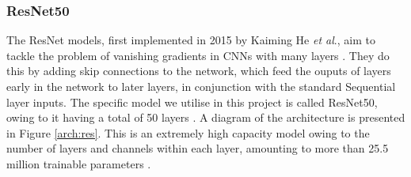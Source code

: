 \documentclass[12pt]{article}
\begin{document}
\subsubsection{ResNet50}
The ResNet models, first implemented in 2015 by Kaiming He \textit{et al}., aim to tackle the problem of vanishing gradients in CNNs with many layers \cite{He15}. They do this by adding skip connections to the network, which feed the ouputs of layers early in the network to later layers, in conjunction with the standard Sequential layer inputs. The specific model we utilise in this project is called ResNet50, owing to it having a total of 50 layers \cite{He15}. A diagram of the architecture is presented in Figure \ref{arch:res}. This is an extremely high capacity model owing to the number of layers and channels within each layer, amounting to more than 25.5 million trainable parameters \cite{He15}.
\end{document}
